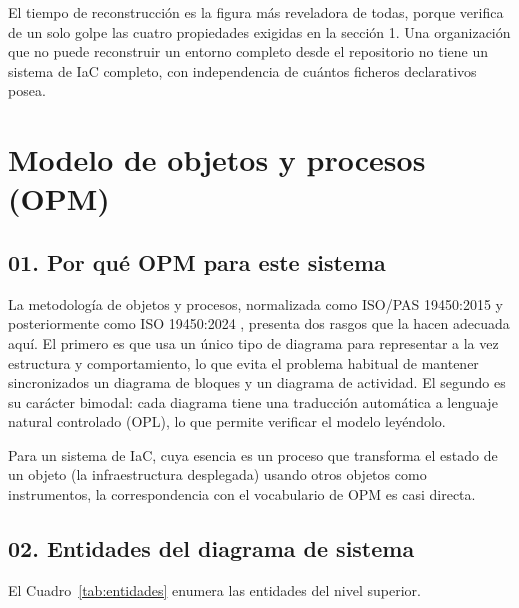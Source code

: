 \documentclass[11pt,letterpaper]{article}
\begin{document}
El tiempo de reconstrucción es la figura más reveladora de todas, porque
verifica de un solo golpe las cuatro propiedades exigidas en la sección 1. Una
organización que no puede reconstruir un entorno completo desde el repositorio
no tiene un sistema de IaC completo, con independencia de cuántos ficheros
declarativos posea.

\section{Modelo de objetos y procesos (OPM)}

\subsection*{01. Por qué OPM para este sistema}

La metodología de objetos y procesos, normalizada como ISO/PAS 19450:2015 y
posteriormente como ISO 19450:2024
\parencite{iso19450:2015,iso19450:2024,dori2002,dori2016}, presenta dos rasgos que la
hacen adecuada aquí. El primero es que usa un único tipo de diagrama para
representar a la vez estructura y comportamiento, lo que evita el problema
habitual de mantener sincronizados un diagrama de bloques y un diagrama de
actividad. El segundo es su carácter bimodal: cada diagrama tiene una
traducción automática a lenguaje natural controlado (OPL), lo que permite
verificar el modelo leyéndolo.

Para un sistema de IaC, cuya esencia es un proceso que transforma el estado de
un objeto (la infraestructura desplegada) usando otros objetos como
instrumentos, la correspondencia con el vocabulario de OPM es casi directa.

\subsection*{02. Entidades del diagrama de sistema}

El Cuadro~\ref{tab:entidades} enumera las entidades del nivel superior.
\end{document}
